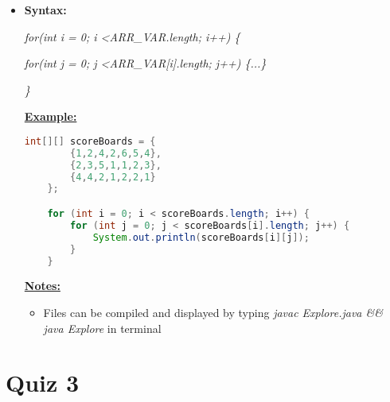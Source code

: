 \documentclass[12pt]{article}
\begin{document}
\bigskip

\begin{itemize}
    \item \textbf{Syntax:}

    \textit{for(int i = 0; i \textless ARR\_VAR.length; i++) \{}

    \textit{    for(int j = 0; j \textless ARR\_VAR[i].length; j++) \{...\}}

    \textit{\}}

    \bigskip

    \underline{\textbf{Example:}}

    \bigskip

    \begin{lstlisting}[language=Java, caption={lesson\_07/Explore.java}]
    int[][] scoreBoards = {
        {1,2,4,2,6,5,4},
        {2,3,5,1,1,2,3},
        {4,4,2,1,2,2,1}
    };

    for (int i = 0; i < scoreBoards.length; i++) {
        for (int j = 0; j < scoreBoards[i].length; j++) {
            System.out.println(scoreBoards[i][j]);
        }
    }
    \end{lstlisting}

    \underline{\textbf{Notes:}}

    \bigskip

    \begin{itemize}
        \item Files can be compiled and displayed by typing \textit{javac Explore.java \&\& java Explore}
        in terminal
    \end{itemize}
\end{itemize}

\bigskip



\bigskip

\section{Quiz 3}

\bigskip
\end{document}
